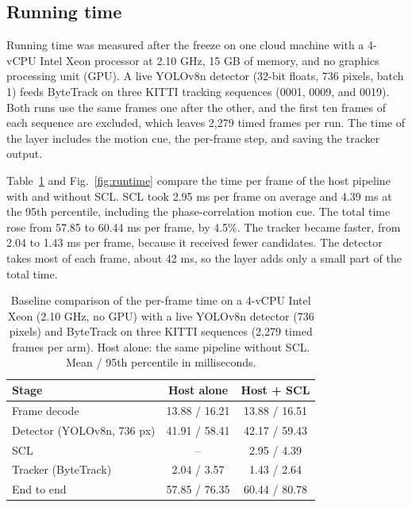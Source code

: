 \documentclass[pdflatex,sn-mathphys-num,iicol]{sn-jnl}
\newcommand{\scl}{SCL}
\begin{document}
\subsection{Running time}\label{sec:latency}
\label{sec:latency-setup}Running time was measured after the freeze on one cloud machine with a 4-vCPU
Intel Xeon processor at 2.10 GHz, 15 GB of memory, and no graphics processing unit (GPU). A live YOLOv8n
detector (32-bit floats, 736 pixels, batch 1) feeds ByteTrack on three KITTI
tracking sequences (0001, 0009, and 0019). Both runs use the same frames
one after the other, and the first ten frames of each sequence are excluded,
which leaves 2,279 timed frames per run. The time of the layer includes the
motion cue, the per-frame step, and saving the tracker output.

Table~\ref{tab:runtime} and Fig.~\ref{fig:runtime} compare the time per frame
of the host pipeline with and without \scl{}. \scl{} took 2.95 ms per
frame on average and 4.39 ms at the 95th percentile, including the
phase-correlation motion cue. The total time rose from 57.85 to 60.44 ms
per frame, by 4.5\%. The tracker became faster, from 2.04 to 1.43 ms per
frame, because it received fewer candidates. The detector takes most of each
frame, about 42 ms, so the layer adds only a small part of the total time.

\begin{table}[t]
\caption{Baseline comparison of the per-frame time on a 4-vCPU Intel Xeon
(2.10 GHz, no GPU) with a live YOLOv8n detector (736 pixels) and ByteTrack on
three KITTI sequences (2,279 timed frames per arm). Host alone: the same
pipeline without \scl{}. Mean / 95th percentile in milliseconds.}
\label{tab:runtime}
\centering\footnotesize
\setlength{\tabcolsep}{4pt}
\begin{tabular}{@{}lcc@{}}
\toprule
Stage & Host alone & Host + \scl{}\\
\midrule
Frame decode & 13.88 / 16.21 & 13.88 / 16.51\\
Detector (YOLOv8n, 736 px) & 41.91 / 58.41 & 42.17 / 59.43\\
\scl{} & -- & 2.95 / 4.39\\
Tracker (ByteTrack) & 2.04 / 3.57 & 1.43 / 2.64\\
End to end & 57.85 / 76.35 & 60.44 / 80.78\\
\bottomrule
\end{tabular}
\end{table}
\end{document}
